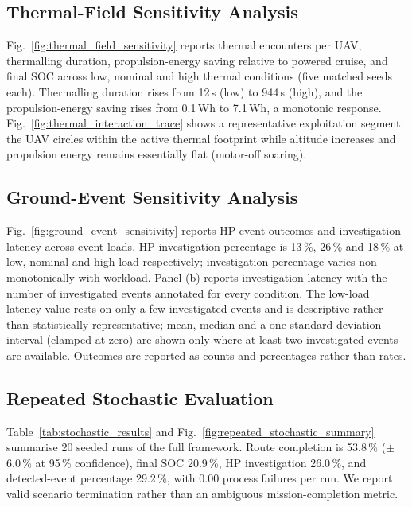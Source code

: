 \subsection{Thermal-Field Sensitivity Analysis}
Fig.~\ref{fig:thermal_field_sensitivity} reports thermal encounters per UAV, thermalling duration, propulsion-energy saving relative to powered cruise, and final SOC across low, nominal and high thermal conditions (five matched seeds each). Thermalling duration rises from 12\,s (low) to 944\,s (high), and the propulsion-energy saving rises from 0.1\,Wh to 7.1\,Wh, a monotonic response. Fig.~\ref{fig:thermal_interaction_trace} shows a representative exploitation segment: the UAV circles within the active thermal footprint while altitude increases and propulsion energy remains essentially flat (motor-off soaring).

\subsection{Ground-Event Sensitivity Analysis}
Fig.~\ref{fig:ground_event_sensitivity} reports HP-event outcomes and investigation latency across event loads. HP investigation percentage is 13\,\%, 26\,\% and 18\,\% at low, nominal and high load respectively; investigation percentage varies non-monotonically with workload. Panel (b) reports investigation latency with the number of investigated events annotated for every condition. The low-load latency value rests on only a few investigated events and is descriptive rather than statistically representative; mean, median and a one-standard-deviation interval (clamped at zero) are shown only where at least two investigated events are available. Outcomes are reported as counts and percentages rather than rates.

\subsection{Repeated Stochastic Evaluation}
Table~\ref{tab:stochastic_results} and Fig.~\ref{fig:repeated_stochastic_summary} summarise 20 seeded runs of the full framework. Route completion is 53.8\,\% ($\pm$6.0\,\% at 95\,\% confidence), final SOC 20.9\,\%, HP investigation 26.0\,\%, and detected-event percentage 29.2\,\%, with 0.00 process failures per run. We report valid scenario termination rather than an ambiguous mission-completion metric.

